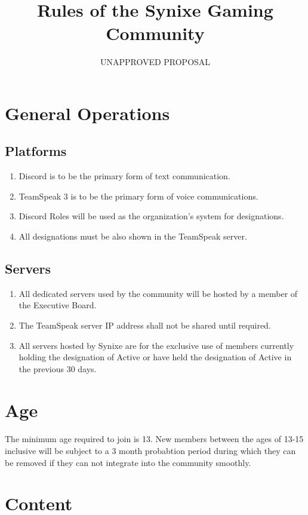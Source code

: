 \documentclass[10pt,a4paper]{article}
\title{Rules of the Synixe Gaming Community}
\author{UNAPPROVED PROPOSAL}
\begin{document}
\maketitle
\newpage

\section{General Operations}
\subsection{Platforms}
\begin{enumerate}
	\item Discord is to be the primary form of text communication.
	\item TeamSpeak 3 is to be the primary form of voice communications.
	\item Discord Roles will be used as the organization's system for designations.
	\item All designations must be also shown in the TeamSpeak server.
\end{enumerate}
\subsection{Servers}
\begin{enumerate}
	\item All dedicated servers used by the community will be hosted by a member of the Executive Board.
	\item The TeamSpeak server IP address shall not be shared until required.
	\item All servers hosted by Synixe are for the exclusive use of members currently holding the designation of Active or have held the designation of Active in the previous 30 days.
\end{enumerate}
\section{Age}
\paragraph{}
The minimum age required to join is 13. New members between the ages of 13-15 inclusive will be subject to a 3 month probabtion period during which they can be removed if they can not integrate into the community smoothly.
\section{Content} \label{content}
\end{document}
